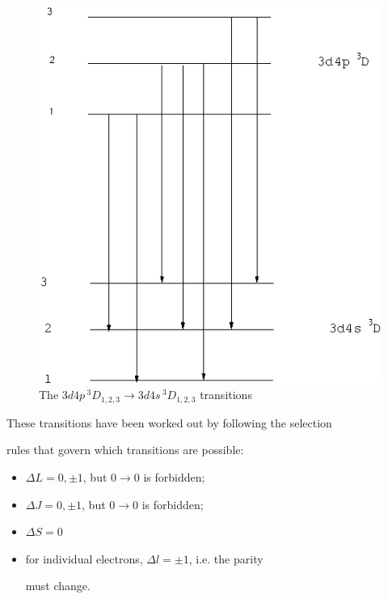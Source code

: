 \documentclass[a4paper]{article}
\begin{document}
\begin{figure}[htb!]

\centering

\includegraphics[scale=0.35]{transition1}

\caption{The $3d4p\,^3D_{1,2,3} \to 3d4s\,^3D_{1,2,3}$ transitions}

\label{fig:transition1}

\end{figure}

These transitions have been worked out by following the selection

rules that govern which transitions are possible:

\begin{itemize}

\item $\Delta L = 0, \pm 1$, but $0 \to 0$ is forbidden;

\item $\Delta J = 0, \pm 1$, but $0 \to 0$ is forbidden;

\item $\Delta S = 0$

\item for individual electrons, $\Delta l = \pm 1$, i.e. the parity

must change.

\end{itemize}
\end{document}
